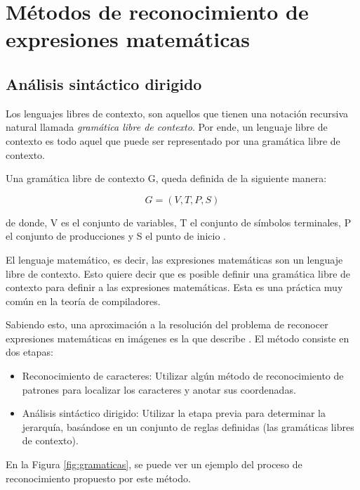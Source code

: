 \section{Métodos de reconocimiento de expresiones matemáticas}
\subsection{Análisis sintáctico dirigido}
Los lenguajes libres de contexto, son aquellos que tienen una notación recursiva natural llamada \textit{gramática libre de contexto}. Por ende, un lenguaje libre de contexto es todo aquel que puede ser representado por una gramática libre de contexto.

Una gramática libre de contexto G, queda definida de la siguiente manera:

\begin{equation}
    G = (V, T, P, S)
\end{equation}

de donde, V es el conjunto de variables, T el conjunto de símbolos terminales, P el conjunto de producciones y S el punto de inicio \cite{automata}.

El lenguaje matemático, es decir, las expresiones matemáticas son un lenguaje libre de contexto. Esto quiere decir que es posible definir una gramática libre de contexto para definir a las expresiones matemáticas. Esta es una práctica muy común en la teoría de compiladores.

Sabiendo esto, una aproximación a la resolución del problema de reconocer expresiones matemáticas en imágenes es la que describe \cite{gramaticasAnderson}. El método consiste en dos etapas:

\begin{itemize}
    \item Reconocimiento de caracteres: Utilizar algún método de reconocimiento de patrones para localizar los caracteres y anotar sus coordenadas. 
    \item Análisis sintáctico dirigido: Utilizar la etapa previa para determinar la jerarquía, basándose en un conjunto de reglas definidas (las gramáticas libres de contexto).
\end{itemize}

En la Figura \ref{fig:gramaticas}, se puede ver un ejemplo del proceso de reconocimiento propuesto por este método.

